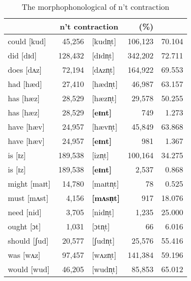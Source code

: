 \documentclass[output=paper,
modfonts
]{LSP/langsci}
\begin{document}
\begin{table}[h!] 
\begin{center}
\caption{The morphophonological  of n't
  contraction}
\begin{tabularx}{\textwidth}{Xr X rr }
\lsptoprule
\multicolumn{2}{c}{aux+not}  &  \multicolumn{2}{c}{n't contraction}  &   (\%)  \\ 
\midrule
could [kud] & 45,256 & [kudn̩t]  & 106,123 &
                                                          \hspace{0.15cm} 70.104 \\ 
did [dɪd]  & 128,432 & [dɪdn̩t] & 342,202 & 72.711 \\
does [dʌz] &72,194& [dʌzn̩t] & 164,922 & 69.553\\
had [hæd] &27,410  & [hædn̩t] & 46,987 & 63.157\\
has [hæz] & 28,529  & [hæzn̩t] & 29,578 &
                                                               50.255\\
has [hæz] & 28,529  & {\textbf{[eɪnt]}} &749 &
                                                               1.273\\
have [hæv] & 24,957& [hævn̩t] & 45,849 &
                                                              63.868\\
have [hæv] & 24,957& {\textbf{[eɪnt]}} & 981 &
                                                              1.367\\
is  [ɪz] &  189,538& [izn̩t] & 100,164 & 34.275\\
is  [ɪz] &  189,538& {\textbf{[eɪnt]}} & 2,537 & 0.868\\
might  [maɪt] & 14,780 & [maɪtn̩t] &
                                                                      78 & 0.525\\
must  [mʌst] & 4,156 & {\textbf{[mʌsn̩t]}} &  917 & 18.076\\
need  [nid]  & 3,705 & [nidn̩t] & 1,235 & 25.000\\
ought  [ɔt] & 1,031  & [ɔtn̩t] & 66 & 6.016 \\
should  [ʃud] & 20,577  & [ʃudn̩t] & 25,576 &
  55.416\\
was  [wʌz] &97,457  & [wʌzn̩t] & 141,384 & 59.196\\
would [wud] &46,205 & [wudn̩t] & 85,853 & 65.012 \\
 
\midrule 


\end{tabularx}
\end{center}
\end{table}
\end{document}
